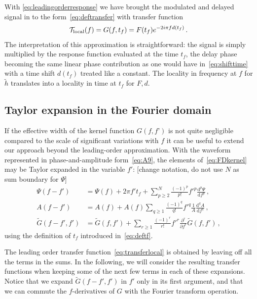 \documentclass[aps,showpacs,twocolumn,
prd,superscriptaddress,nofootinbib]{revtex4-1}
\newcommand{\be}{\begin{equation}}
\newcommand{\ee}{\end{equation}}
\newcommand\ud{{\mathrm{d}}}
\newcommand\calT{{\mathcal{T}}}
\newcommand{\tf}{t_{f}}
\newcommand{\SM}[1]{{\color{Red} #1}}
\newcommand{\jgb}[1]{{\color{DarkGreen} #1}}
\begin{document}
With \eqref{eq:leadingorderresponse} we have brought the modulated and delayed signal in to the form~\eqref{eq:deftransfer} with transfer function
\be\label{eq:transferlocal}
	\calT_{\rm local}(f) = G(f, \tf) = F(t_{f}) e^{-2i\pi f d(t_{f})}\,.
\ee
The interpretation of this approximation is straightforward: the signal is simply multiplied by the response function evaluated at the time $\tf$, the delay phase becoming the same linear phase contribution as one would have in~\eqref{eq:shifttime} with a time shift $d(t_{f})$ treated like a constant. The locality in frequency at $f$ for $\tilde{h}$ translates into a locality in time at $t_{f}$ for $F,d$.


\subsection{Taylor expansion in the Fourier domain}
\label{subsec:TaylorFD}

\jgb{If the effective width of the kernel function $G(f,f’)$ is not quite negligible compared to the scale of significant variations with $f$ it can be useful to extend our approach beyond the leading-order approximation. With the waveform represented in phase-and-amplitude form~\eqref{eq:A9}, the elements of~\eqref{eq:FDkernel} may be Taylor expanded in the variable $f'$: \SM{[change notation, do not use $N$ as sum boundary for $\Psi$]}
\begin{subequations}\label{eq:expandfprime}
\begin{align}
	\Psi(f-f') &= \Psi(f) + 2\pi f' \tf + \sum\limits_{p\geq 2}^{N} \frac{(-1)^{p}}{p!} {f'}^{p} \frac{\ud^{p} \Psi}{\ud f^{p}} \,, \label{eq:expandPsi}\\
	A(f-f') &= A(f)+A(f) \sum\limits_{q\geq 1} \frac{(-1)^{q}}{q!} {f'}^{q} \frac{1}{A}\frac{\ud^{q} A}{\ud f^{q}} \,, \label{eq:expandA}\\
	\tilde{G}(f-f', f') &=\tilde G(f,f')+ \sum\limits_{r\geq 1} \frac{(-1)^{r}}{r!} {f'}^{r} \frac{\partial^{r} }{\partial f^{r}}  \tilde{G}(f,f') \label{eq:expandG} \,,
\end{align}
\end{subequations}
using the definition of $t_{f}$ introduced in~\eqref{eq:deftf}.}

\jgb{The leading order transfer function~\eqref{eq:transferlocal} is obtained by leaving off all the terms in the sums.  In the following, we will consider the resulting transfer functions when keeping some of the next few terms in each of these expansions.} 
Notice that we expand $\tilde{G}(f-f',f')$ in $f'$ only in its first argument, and that we can commute the $f$-derivatives of $G$ with the Fourier transform operation.
\end{document}
